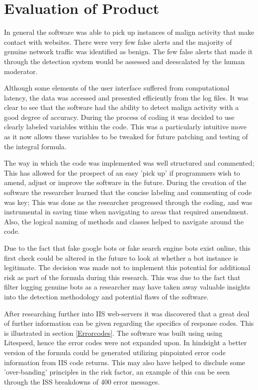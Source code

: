 \section{Evaluation of Product}

In general the software was able to pick up instances of malign activity that make contact with websites. There were very few false alerts and the majority of genuine network traffic was identified as benign. The few false alerts that made it through the detection system would be assessed and deescalated by the human moderator.

Although some elements of the user interface suffered from computational latency, the data was accessed and presented efficiently from the log files. It was clear to see that the software had the ability to detect malign activity with a good degree of accuracy. During the process of coding it was decided to use clearly labeled variables within the code. This was a particularly intuitive move as it now allows these variables to be tweaked for future patching and testing of the integral formula. 

The way in which the code was implemented was well structured and commented; This has allowed for the prospect of an easy 'pick up' if programmers wish to amend, adjust or improve the software in the future. During the creation of the software the researcher learned that the concise labeling and commenting of code was key; This was done as the researcher progressed through the coding, and was instrumental in saving time when navigating to areas that required amendment. Also, the logical naming of methods and classes helped to navigate around the code.

Due to the fact that fake google bots or fake search engine bots exist online, this first check could be altered in the future to look at whether a bot instance is legitimate. The decision was made not to implement this potential for additional risk as part of the formula during this research. This was due to the fact that filter logging genuine bots as a researcher may have taken away valuable insights into the detection methodology and potential flaws of the software. 

After researching further into IIS web-servers it was discovered that a great deal of further information can be given regarding the specifics of response codes. This is illustrated in section \ref{Errorcodes}. The software was built using using Litespeed, hence the error codes were not expanded upon. In hindsight a better version of the formula could be generated utilizing pinpointed error code information from IIS code returns. This may also have helped to disclude some 'over-banding' principles in the risk factor, an example of this can be seen through the ISS breakdowns of 400 error messages.

